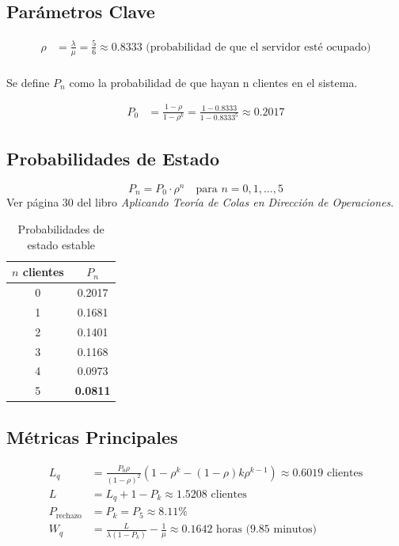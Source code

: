 \documentclass{article}
\begin{document}
\subsection{Parámetros Clave}
\begin{align*}
    \rho &= \frac{\lambda}{\mu} = \frac{5}{6} \approx 0.8333 \text{ (probabilidad de que el servidor esté ocupado)}\\
\end{align*}

Se define $P_n$ como la probabilidad de que hayan n clientes en el sistema.

\begin{align*}
    P_0 &= \frac{1 - \rho}{1 - \rho^k} = \frac{1 - 0.8333}{1 - 0.8333^5} \approx 0.2017
\end{align*}

\subsection{Probabilidades de Estado}
\[
P_n = P_0 \cdot \rho^n \quad \text{para } n = 0,1,\dots,5
\] Ver página 30 del libro \textit{Aplicando Teoría de Colas en Dirección de Operaciones}.

\begin{table}[H]
    \centering
    \caption{Probabilidades de estado estable}
    \begin{tabular}{cc}
        \toprule
        $n$ clientes & $P_n$ \\ 
        \midrule
        0 & 0.2017 \\ 
        1 & 0.1681 \\ 
        2 & 0.1401 \\ 
        3 & 0.1168 \\ 
        4 & 0.0973 \\ 
        5 & \textbf{0.0811} \\ 
        \bottomrule
    \end{tabular}
\end{table}

\subsection{Métricas Principales}
\begin{align*}
    L_q &= \frac{P_0 \rho}{(1 - \rho)^2} \left(1 - \rho^k - (1 - \rho)k\rho^{k-1}\right) \approx 0.6019 \text{ clientes} \\
    L &= L_q + 1 - P_k \approx 1.5208 \text{ clientes} \\
    P_{\text{rechazo}} &= P_k = P_5 \approx 8.11\% \\
    W_q &= \frac{L}{\lambda (1 - P_k)} - \frac{1}{\mu} \approx 0.1642 \text{ horas (9.85 minutos)}\\
\end{align*}
\end{document}
